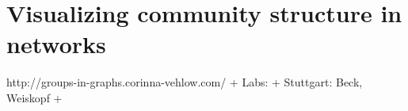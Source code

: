 \section{Visualizing community structure in
networks}\label{visualizing-community-structure-in-networks}

http://groups-in-graphs.corinna-vehlow.com/ + Labs: + Stuttgart: Beck,
Weiskopf +

